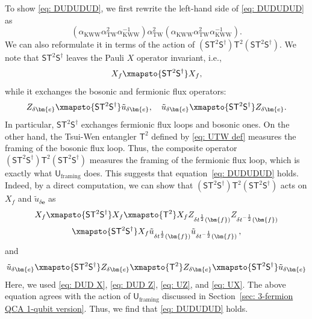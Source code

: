 \documentclass[aps,twocolumn,prx,floatfix,preprintnumbers, nofootinbib,10pt]{revtex4-2}
\numberwithin{equation}{section}
\theoremstyle{definition}
\theoremstyle{remark}
\theoremstyle{claim}
\newcommand{\be}{\begin{equation}}
\newcommand{\ee}{\end{equation}}
\newcommand{\aKWW}{\alpha_\text{KWW}}
\newcommand{\aTW}{\alpha_\text{TW}}
\renewcommand{\sf}[1]{\mathsf{#1}}
\newcommand{\paren}[1]{\left( #1 \right)}
\begin{document}
To show \eqref{eq: DUDUDUD}, we first rewrite the left-hand side of \eqref{eq: DUDUDUD} as
\be
\paren{\aKWW \aTW^2 \aKWW^{-1}} \aTW^2 \paren{\aKWW \aTW^2 \aKWW^{-1}}.
\ee
We can also reformulate it in terms of the action of $(\sf{S} \sf{T}^2 \sf{S}^\dag) \sf{T}^2 (\sf{S} \sf{T}^2 \sf{S}^\dag)$.
We note that $\sf{S} \sf{T}^2 \sf{S}^\dag$ leaves the Pauli $X$ operator invariant, i.e.,
\begin{equation}
X_f \xmapsto{\sf{S} \sf{T}^2 \sf{S}^\dag} X_f,
\label{eq: DUD X}
\end{equation}
while it exchanges the bosonic and fermionic flux operators:
\begin{equation}
Z_{\delta \bm{e}} \xmapsto{\sf{S} \sf{T}^2 \sf{S}^\dag} \tilde{u}_{\delta \bm{e}}, \quad
\tilde{u}_{\delta \bm{e}} \xmapsto{\sf{S} \sf{T}^2 \sf{S}^\dag} Z_{\delta \bm{e}}.
\label{eq: DUD Z}
\end{equation}
In particular, $\sf{S} \sf{T}^2 \sf{S}^\dag$ exchanges fermionic flux loops and bosonic ones.
On the other hand, the Tsui-Wen entangler $\sf{T}^2$ defined by \eqref{eq: UTW def} measures the framing of the bosonic flux loop.
Thus, the composite operator $(\sf{S} \sf{T}^2 \sf{S}^\dag) \sf{T}^2 (\sf{S} \sf{T}^2 \sf{S}^\dag)$ measures the framing of the fermionic flux loop, which is exactly what $\sf{U}_{\text{framing}}$ does.
This suggests that equation~\eqref{eq: DUDUDUD} holds.
Indeed, by a direct computation, we can show that $(\sf{S} \sf{T}^2 \sf{S}^\dag) \sf{T}^2 (\sf{S} \sf{T}^2 \sf{S}^\dag)$ acts on $X_f$ and $\tilde{u}_{\delta \bm{e}}$ as
\begin{multline}
 X_f \xmapsto{\sf{S} \sf{T}^2 \sf{S}^\dag} X_f \xmapsto{\sf{T}^2} X_f Z_{\delta t^{\frac{1}{2}}(\bm{f})} Z_{\delta t^{-\frac{1}{2}}(\bm{f})} \\
 \xmapsto{\sf{S} \sf{T}^2 \sf{S}^\dag} X_f \tilde{u}_{\delta t^{\frac{1}{2}}(\bm{f})} \tilde{u}_{\delta t^{-\frac{1}{2}}(\bm{f})} \,,
\end{multline}
and
\begin{equation}\label{eq: DUDUDUD X u}
 \tilde{u}_{\delta \bm{e}} \xmapsto{\sf{S} \sf{T}^2 \sf{S}^\dag} Z_{\delta \bm{e}} \xmapsto{\sf{T}^2} Z_{\delta \bm{e}} \xmapsto{\sf{S} \sf{T}^2 \sf{S}^\dag} \tilde{u}_{\delta \bm{e}}
\end{equation}
Here, we used \eqref{eq: DUD X}, \eqref{eq: DUD Z}, \eqref{eq: UZ}, and \eqref{eq: UX}.
The above equation agrees with the action of $\sf{U}_{\text{framing}}$ discussed in Section~\ref{sec: 3-fermion QCA 1-qubit version}.
Thus, we find that \eqref{eq: DUDUDUD} holds.
\end{document}
